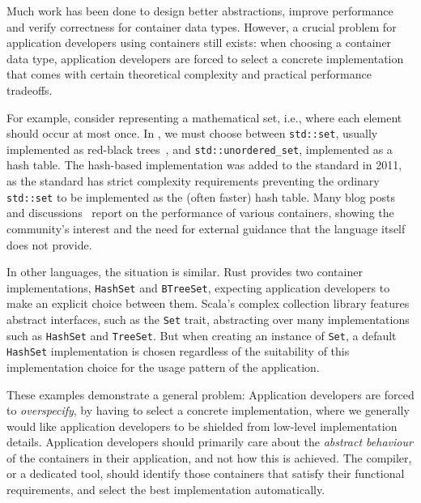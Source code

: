 Much work has been done to design better abstractions, improve performance and verify correctness for container data types.
However, a crucial problem for application developers using containers still exists:
when choosing a container data type, application developers are forced to select a concrete implementation that comes with certain theoretical complexity and practical performance tradeoffs.

For example, consider representing a mathematical set, i.e., where each element should occur at most once.
In \Cpp, we must choose between \lstinline{std::set}, usually implemented as red-black trees~\citep{DBLP:journals/acta/Bayer72}, and \lstinline{std::unordered_set}, implemented as a hash table.
The hash-based implementation was added to the \Cpp standard in 2011, as the \Cpp standard has strict complexity requirements preventing the ordinary \lstinline{std::set} to be implemented as the (often faster) hash table.
Many blog posts and discussions~\citep{blog1,blog2,blog3,blog4,blog5} report on the performance of various \Cpp containers, showing the community's interest and the need for external guidance that the language itself does not provide.

In other languages, the situation is similar.
Rust provides two container implementations, \lstinline{HashSet} and \lstinline{BTreeSet}, expecting application developers to make an explicit choice between them.
Scala's complex collection library features abstract interfaces, such as the \lstinline{Set} trait, abstracting over many implementations such as \lstinline{HashSet} and \lstinline{TreeSet}.
But when creating an instance of \lstinline{Set}, a default \lstinline{HashSet} implementation is chosen regardless of the suitability of this implementation choice for the usage pattern of the application.

These examples demonstrate a general problem:
Application developers are forced to \emph{overspecify}, by having to select a concrete implementation, where we generally would like application developers to be shielded from low-level implementation details.
Application developers should primarily care about the \emph{abstract behaviour} of the containers in their application, and not how this is achieved.
The compiler, or a dedicated tool, should identify those containers that satisfy their functional requirements, and select the best implementation automatically.

